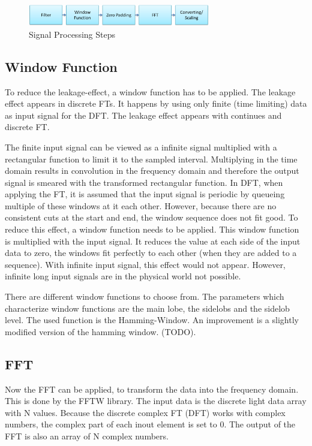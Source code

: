 \documentclass[notitlepage]{scrreprt}
\begin{document}
\begin{figure}[H]
	\centering
	\includegraphics[width=300px]{images/signal_processing_steps1.png}
	\caption{Signal Processing Steps}
	\label{fig:signal-processing-steps1}
\end{figure}

\subsection{Window Function}
To reduce the leakage-effect, a window function has to be applied. The leakage effect appears in discrete FTs. It happens by using only finite (time limiting) data as input signal for the DFT. The leakage effect appears with continues and discrete FT.

The finite input signal can be viewed as a infinite signal multiplied with a rectangular function to limit it to the sampled interval. Multiplying in the time domain results in convolution in the frequency domain and therefore the output signal is smeared with the transformed rectangular function. In DFT, when applying the FT, it is assumed that the input signal is periodic by queueing multiple of these windows at it each other. However, because there are no consistent cuts at the start and end, the window sequence does not fit good. To reduce this effect, a window function needs to be applied. This window function is multiplied with the input signal. It reduces the value at each side of the input data to zero, the windows fit perfectly to each other (when they are added to a sequence). With infinite input signal, this effect would not appear. However, infinite long input signals are in the physical world not possible.

There are different window functions to choose from. The parameters which characterize window functions are the main lobe, the sidelobs and the sidelob level. The used function is the Hamming-Window. An improvement is a slightly modified version of the hamming window. (TODO).

\subsection{FFT}
Now the FFT can be applied, to transform the data into the frequency domain. This is done by the FFTW library. The input data is the discrete light data array with N values. Because the discrete complex FT (DFT) works with complex numbers, the complex part of each inout element is set to 0. The output of the FFT is also an array of N complex numbers.
\end{document}
